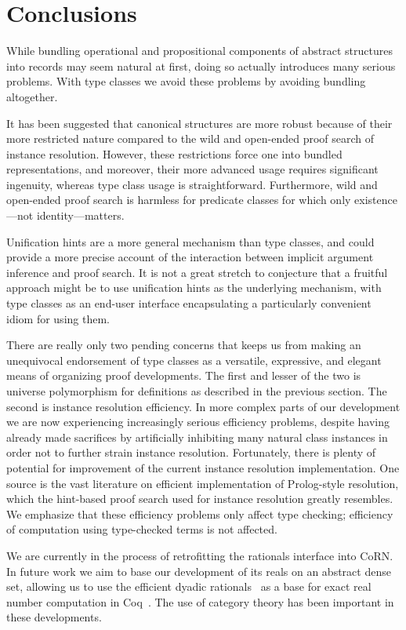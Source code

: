 \documentclass[a4paper,10pt,runningheads]{llncs}
\begin{document}
\section{Conclusions}\label{conclusions}

While bundling operational and propositional components of abstract structures into records may seem natural at first, doing so actually introduces many serious problems. With type classes we avoid these problems by avoiding bundling altogether.

It has been suggested that canonical structures are more robust because of their more restricted nature compared to the wild and open-ended proof search of instance resolution. However, these restrictions force one into bundled representations, and moreover, their more advanced usage requires significant ingenuity, whereas type class usage is straightforward. Furthermore, wild and open-ended proof search is harmless for predicate classes for which only existence---not identity---matters.

Unification hints are a more general mechanism than type classes, and could provide a more precise account of the interaction between implicit argument inference and proof search. It is not a great stretch to conjecture that a fruitful approach might be to use unification hints as the underlying mechanism, with type classes as an end-user interface encapsulating a particularly convenient idiom for using them.

There are really only two pending concerns that keeps us from making an unequivocal endorsement of type classes as a versatile, expressive, and elegant means of organizing proof developments. The first and lesser of the two is universe polymorphism for definitions as described in the previous section. The second is instance resolution efficiency. In more complex parts of our development we are now experiencing increasingly serious efficiency problems, despite having already made sacrifices by artificially inhibiting many natural class instances in order not to further strain instance resolution.
Fortunately, there is plenty of potential for improvement of the current instance resolution implementation. One source is the vast literature on efficient implementation of Prolog-style resolution, which the hint-based proof search used for instance resolution greatly resembles. We emphasize that these efficiency problems only affect type checking; efficiency of computation using type-checked terms is not affected.


We are currently in the process of retrofitting the rationals interface into CoRN. In future work we aim to base our development of its reals on an abstract dense set, allowing us to use the efficient dyadic rationals~\cite{boldo2009combining} as a base for exact real number computation in Coq~\cite{Oconnor:real,Riemann}. The use of category theory has been important in these developments.
\end{document}
